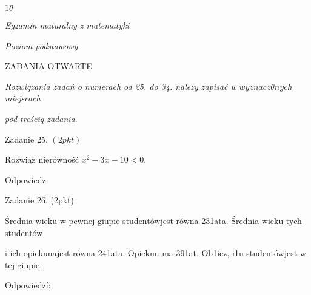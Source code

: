 \documentclass[a4paper,12pt]{article}
\begin{document}
$ 1\theta$

{\it Egzamin maturalny z matematyki}

{\it Poziom podstawowy}

ZADANIA OTWARTE

{\it Rozwiqzania zadań o numerach od 25. do 34. nalezy zapisać w} $wyznacz\theta nych$ {\it miejscach}

{\it pod treściq zadania}.

Zadanie 25. $(2pkt)$

Rozwiąz nierówność $x^{2}-3x-10<0.$

Odpowiedz:

Zadanie 26. (2pkt)

Średnia wieku w pewnej giupie studentówjest równa 231ata. Średnia wieku tych studentów

i ich opiekunajest równa 241ata. Opiekun ma 391at. Ob1icz, i1u studentówjest w tej giupie.

Odpowiedzí:
\end{document}
